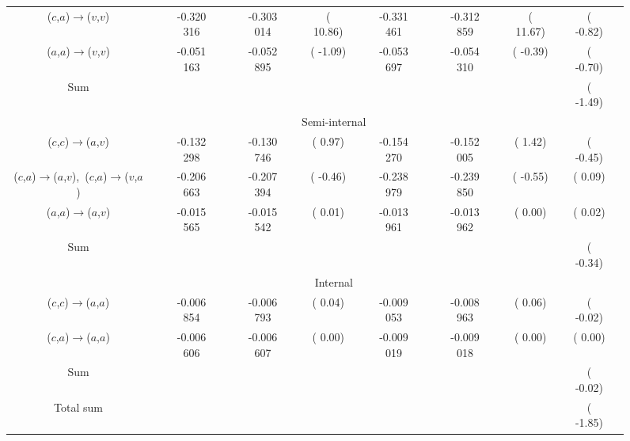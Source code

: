 \documentclass[aip,jcp,amsmath,twocolumn,floatfix,reprint,fleqn]{revtex4-1}
\begin{document}
{\begin{figure}
\begin{longtable}[!ht]{cccccccccccccccc}
($c$,$a$)$\rightarrow$($v$,$v$)                                   && -0.320 316  && -0.303 014  && ( 10.86)  && -0.331 461  && -0.312 859  && ( 11.67) && ( -0.82)\\
($a$,$a$)$\rightarrow$($v$,$v$)                                   && -0.051 163  && -0.052 895  && ( -1.09)  && -0.053 697  && -0.054 310  && ( -0.39) && ( -0.70)\\
Sum                                                               &&             &&             &&           &&             &&             &&          && ( -1.49)\\
                                                                                                                                          
                                                                  && \multicolumn{10}{c}{Semi-internal} \\                 
($c$,$c$)$\rightarrow$($a$,$v$)                                   && -0.132 298  && -0.130 746  && (  0.97)  && -0.154 270  && -0.152 005  && (  1.42) && ( -0.45)\\
($c$,$a$)$\rightarrow$($a$,$v$),\ ($c$,$a$)$\rightarrow$($v$,$a$) && -0.206 663  && -0.207 394  && ( -0.46)  && -0.238 979  && -0.239 850  && ( -0.55) && (  0.09)\\
($a$,$a$)$\rightarrow$($a$,$v$)                                   && -0.015 565  && -0.015 542  && (  0.01)  && -0.013 961  && -0.013 962  && (  0.00) && (  0.02)\\
Sum                                                               &&             &&             &&           &&             &&             &&          && ( -0.34)\\
                                                                  && \multicolumn{10}{c}{Internal} \\                      
($c$,$c$)$\rightarrow$($a$,$a$)                                   && -0.006 854  && -0.006 793  && (  0.04)  && -0.009 053  && -0.008 963  && (  0.06) && ( -0.02)\\
($c$,$a$)$\rightarrow$($a$,$a$)                                   && -0.006 606  && -0.006 607  && (  0.00)  && -0.009 019  && -0.009 018  && (  0.00) && (  0.00)\\
Sum                                                               &&             &&             &&           &&             &&             &&          && ( -0.02)\\
Total sum                                                         &&             &&             &&           &&             &&             &&          && ( -1.85)\\
\hline
\hline
\end{longtable}
\end{figure}  

}
\end{document}
